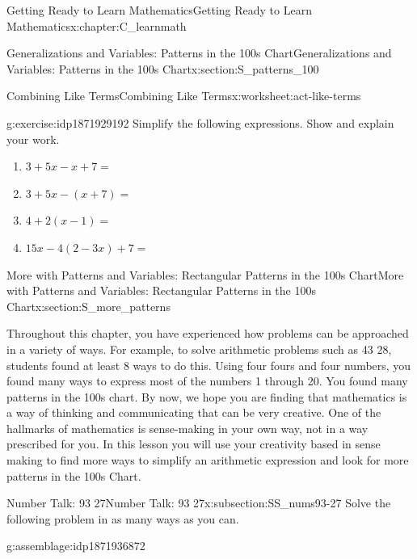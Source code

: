 \documentclass[oneside,10pt,]{book}
\numberwithin{equation}{chapter}
\begin{document}
\begin{chapterptx}{Getting Ready to Learn Mathematics}{}{Getting Ready to Learn Mathematics}{}{}{x:chapter:C_learnmath}
\begin{sectionptx}{Generalizations and Variables: Patterns in the 100s Chart}{}{Generalizations and Variables: Patterns in the 100s Chart}{}{}{x:section:S_patterns_100}
\begin{worksheet-subsection}{Combining Like Terms}{}{Combining Like Terms}{}{}{x:worksheet:act-like-terms}
\begin{divisionexercise}{5}{}{}{g:exercise:idp1871929192}%
Simplify the following expressions. Show and explain your work.%
\begin{enumerate}[font=\bfseries,label=(\alph*),ref=\alph*]
\item{}\(3 + 5x - x + 7 =\)%
\item{}\(3 + 5x - (x + 7) =\)%
\item{}\(4 + 2(x - 1) =\)%
\item{}\(15x - 4(2 - 3x) + 7 =\)%
\end{enumerate}
\end{divisionexercise}%
\end{worksheet-subsection}
\restoregeometry
\end{sectionptx}
%
%
\typeout{************************************************}
\typeout{************************************************}
%
\begin{sectionptx}{More with Patterns and Variables: Rectangular Patterns in the 100s Chart}{}{More with Patterns and Variables: Rectangular Patterns in the 100s Chart}{}{}{x:section:S_more_patterns}
\begin{introduction}{}%
Throughout this chapter, you have experienced how problems can be approached in a variety of ways. For example, to solve arithmetic problems such as 43 \textminus{} 28, students found at least 8 ways to do this. Using four fours and four numbers, you found many ways to express most of the numbers 1 through 20. You found many patterns in the 100s chart. By now, we hope you are finding that mathematics is a way of thinking and communicating that can be very creative. One of the hallmarks of mathematics is sense-making in your own way, not in a way prescribed for you. In this lesson you will use your creativity based in sense making to find more ways to simplify an arithmetic expression and look for more patterns in the 100s Chart.%
\end{introduction}%
%
%
\typeout{************************************************}
\typeout{************************************************}
%
\begin{subsectionptx}{Number Talk: 93 \textminus{} 27}{}{Number Talk: 93 \textminus{} 27}{}{}{x:subsection:SS_nums93-27}
Solve the following problem in as many ways as you can.%
\begin{assemblage}{}{g:assemblage:idp1871936872}%

\end{assemblage}
\end{subsectionptx}
\end{sectionptx}
\end{chapterptx}
\end{document}
